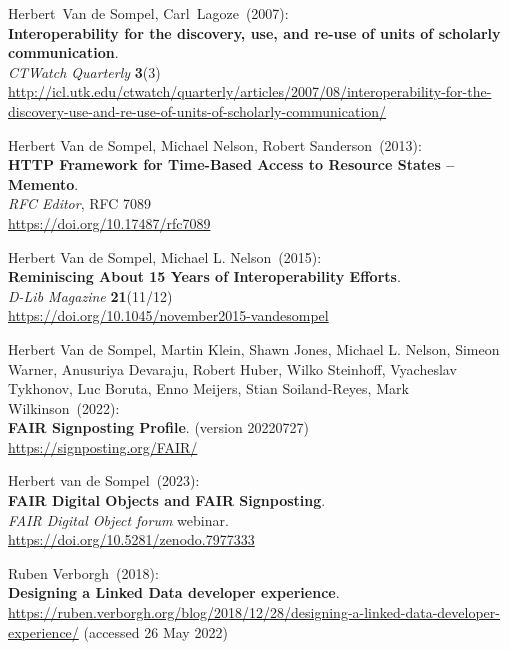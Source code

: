 \begin{thebibliography}{9}
Herbert~Van de Sompel, Carl~Lagoze~(2007): \\
\textbf{Interoperability for the discovery, use, and re-use of units of scholarly communication}.\\
\emph{CTWatch Quarterly} \textbf{3}(3)\\
\url{http://icl.utk.edu/ctwatch/quarterly/articles/2007/08/interoperability-for-the-discovery-use-and-re-use-of-units-of-scholarly-communication/}

Herbert Van de Sompel, Michael Nelson, Robert Sanderson~(2013): \\
\textbf{{HTTP Framework} for {Time-Based Access} to {Resource States} --{Memento}}.\\
\emph{RFC Editor}, RFC 7089\\
\url{https://doi.org/10.17487/rfc7089}

Herbert Van de Sompel, Michael L. Nelson~(2015): \\
\textbf{Reminiscing About 15 Years of Interoperability Efforts}.\\
\emph{D-Lib Magazine} \textbf{21}(11/12) \\
\url{https://doi.org/10.1045/november2015-vandesompel}

Herbert Van de Sompel, Martin Klein, Shawn Jones, Michael L. Nelson, Simeon Warner, Anusuriya Devaraju, Robert Huber, Wilko Steinhoff, Vyacheslav Tykhonov, Luc Boruta, Enno Meijers, Stian Soiland-Reyes, Mark Wilkinson~(2022): \\
\textbf{FAIR Signposting Profile}. (version 20220727)\\
\url{https://signposting.org/FAIR/}

Herbert van de Sompel~(2023): \\
\textbf{FAIR Digital Objects and FAIR Signposting}.\\
\emph{FAIR Digital Object forum} webinar.\\
\url{https://doi.org/10.5281/zenodo.7977333}

Ruben Verborgh~(2018): \\
\textbf{Designing a {Linked Data} developer experience}.\\
\url{https://ruben.verborgh.org/blog/2018/12/28/designing-a-linked-data-developer-experience/}
(accessed 26 May 2022)


\end{thebibliography}
